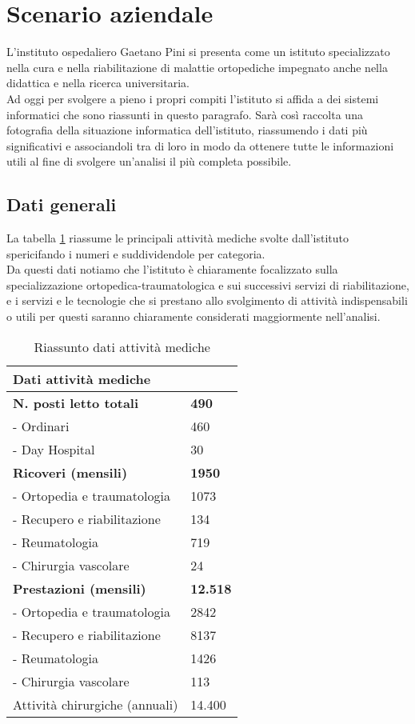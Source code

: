 \newpage

\section{Scenario aziendale} \label{ref:scenario}
	L'instituto ospedaliero Gaetano Pini si presenta come un istituto specializzato nella cura e nella riabilitazione di malattie ortopediche impegnato anche nella didattica e nella ricerca universitaria. \\Ad oggi per svolgere a pieno i propri compiti l'istituto si affida a dei sistemi informatici che sono riassunti in questo paragrafo.
	Sarà così raccolta una fotografia della situazione informatica dell'istituto, riassumendo i dati più significativi e associandoli tra di loro in modo da ottenere tutte le informazioni utili al fine di svolgere un'analisi il più completa possibile.
	
	\subsection{Dati generali}
	La tabella \ref{tab:attivitaMediche} riassume le principali attività mediche svolte dall'istituto spericifando i numeri e suddividendole per categoria. \\
	Da questi dati notiamo che l’istituto è chiaramente focalizzato sulla specializzazione ortopedica-traumatologica e sui successivi servizi di riabilitazione, e i servizi e le tecnologie che si prestano allo svolgimento di attività indispensabili o utili per questi saranno chiaramente considerati maggiormente nell'analisi. \\
	\begin{table}[h] 
		\centering
		\begin{tabular}{|l|l|}
			\hline
			\rowcolor[HTML]{EFEFEF} 
			\textbf{Dati attività mediche} & \\ \hline
			\textbf{N. posti letto totali}					& \textbf{490} \\
			- Ordinari 							& 460 \\
			- Day Hospital 					& 30 	\\ \hline
			\textbf{Ricoveri (mensili)}  				& \textbf{1950}			\\
			- Ortopedia e traumatologia   & 1073 \\
			- Recupero e riabilitazione 	& 134 \\
			- Reumatologia 						& 719 \\
			- Chirurgia vascolare  				& 24 \\ \hline
			\textbf{Prestazioni (mensili)}	  			& \textbf{12.518}		\\
			- Ortopedia e traumatologia   & 2842 \\
			- Recupero e riabilitazione 	& 8137 \\
			- Reumatologia 						& 1426 \\
			- Chirurgia vascolare  				& 113 \\ \hline
			Attività chirurgiche (annuali)  & 14.400		\\ \hline
		\end{tabular}
	\caption{Riassunto dati attività mediche}\label{tab:attivitaMediche}
	\end{table}

